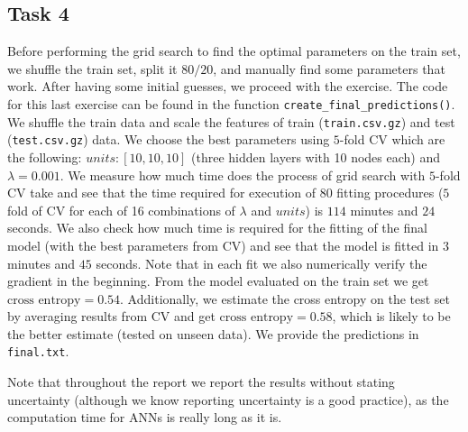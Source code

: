 \documentclass[fleqn,moreauthors,10pt]{ds_report}
\begin{document}
\subsection*{Task 4}
Before performing the grid search to find the optimal parameters on the train set, we shuffle the train set, split it $80/20$, and manually find some parameters that work. After having some initial guesses, we proceed with the exercise.
The code for this last exercise can be found in the function \texttt{create\_final\_predictions()}. We shuffle the train data and scale the features of train (\texttt{train.csv.gz}) and test (\texttt{test.csv.gz}) data. We choose the best parameters using $5$-fold CV which are the following: $units: [10, 10, 10]$ (three hidden layers with 10 nodes each) and $\lambda = 0.001$.
We measure how much time does the process of grid search with $5$-fold CV take and see that the time required for execution of 80 fitting procedures ($5$ fold of CV for each of 16 combinations of $\lambda$ and $units$) is $114$ minutes and $24$ seconds. We also check how much time is required for the fitting of the final model (with the best parameters from CV) and see that the model is fitted in $3$ minutes and $45$ seconds. Note that in each fit we also numerically verify the gradient in the beginning.
From the model evaluated on the train set we get $\text{cross entropy}= 0.54$. Additionally, we estimate the cross entropy on the test set by averaging results from CV and get $\text{cross entropy}= 0.58$, which is likely to be the better estimate (tested on unseen data). We provide the predictions in \texttt{final.txt}.

Note that throughout the report we report the results without stating uncertainty (although we know reporting uncertainty is a good practice), as the computation time for ANNs is really long as it is.









%
%
\end{document}
